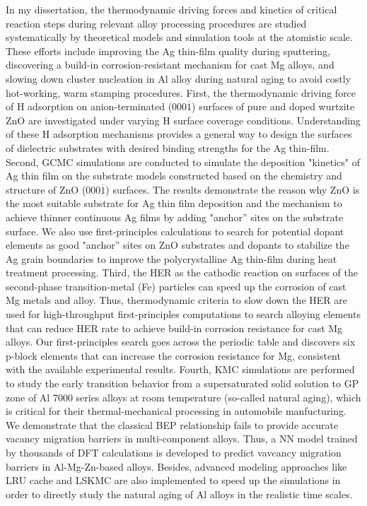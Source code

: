 In my dissertation, the thermodynamic driving forces and kinetics of critical reaction steps during relevant alloy processing procedures are studied systematically by theoretical models and simulation tools at the atomistic scale. These efforts include improving the Ag thin-film quality during sputtering, discovering a build-in corrosion-resistant mechanism for cast Mg alloys, and slowing down cluster nucleation in Al alloy during natural aging to avoid costly hot-working, warm stamping procedures. First, the thermodynamic driving force of H adsorption on anion-terminated (000$\overline{1}$) surfaces of pure and doped wurtzite ZnO are investigated under varying H surface coverage conditions. Understanding of these H adsorption mechanisms provides a general way to design the surfaces of dielectric substrates with desired binding strengths for the Ag thin-film. Second, \acf{GCMC} simulations are conducted to simulate the deposition "kinetics" of Ag thin film on the substrate models constructed based on the chemistry and structure of ZnO (000$\overline{1}$) surfaces. The results demonstrate the reason why ZnO is the most suitable substrate for Ag thin film deposition and the mechanism to achieve thinner continuous Ag films by adding "anchor'' sites on the substrate surface. We also use first-principles calculations to search for potential dopant elements as good "anchor'' sites on ZnO substrates and dopants to stabilize the Ag grain boundaries to improve the polycrystalline Ag thin-film during heat treatment processing. Third, the \acf{HER} as the cathodic reaction on surfaces of the second-phase transition-metal (Fe) particles can speed up the corrosion of cast Mg metals and alloy. Thus, thermodynamic criteria to slow down the HER are used for high-throughput first-principles computations to search alloying elements that can reduce HER rate to achieve build-in corrosion resistance for cast Mg alloys. Our first-principles search goes across the periodic table and discovers six p-block elements that can increase the corrosion resistance for Mg, consistent with the available experimental results. Fourth, \acf{KMC} simulations are performed to study the early transition behavior from a supersaturated solid solution to \acf{GP} zone of Al 7000 series alloys at room temperature (so-called natural aging), which is critical for their thermal-mechanical processing in automobile manfucturing. We demonstrate that the classical \acf{BEP} relationship fails to provide accurate vacancy migration barriers in multi-component alloys. Thus, a \ac{NN} model trained by thousands of \ac{DFT} calculations is developed to predict vavcancy migration barriers in Al-Mg-Zn-based alloys. Besides, advanced modeling approaches like \acf{LRU} cache and \acf{LSKMC} are also implemented to speed up the simulations in order to directly study the natural aging of Al alloys in the realistic time scales.